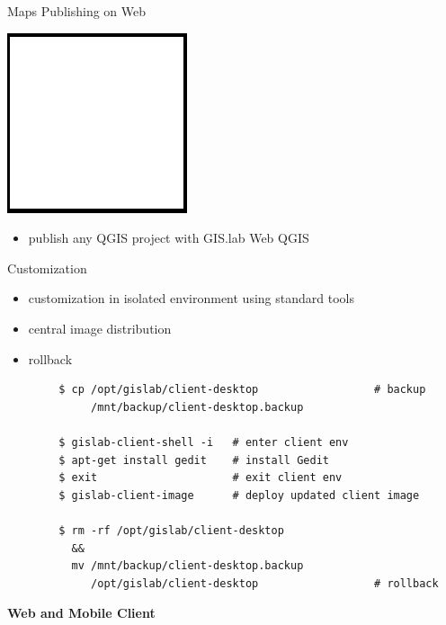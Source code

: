 \documentclass[12pt]{beamer}
\begin{document}
\begin{frame}{Maps Publishing on Web}
	\begin{center}
		\includegraphics[keepaspectratio=true,height=0.5\textheight]{images/image.png}
	\end{center}
	\begin{itemize}
		\item publish any QGIS project with GIS.lab Web QGIS
	\end{itemize}
\end{frame}

\begin{frame}[fragile]{Customization}
	\begin{itemize}
		\item customization in isolated environment using standard tools
		\item central image distribution
		\item rollback
	\end{itemize}
	
	\lstset{language=sh}
	\begin{lstlisting}
		$ cp /opt/gislab/client-desktop                  # backup
		     /mnt/backup/client-desktop.backup
		
		$ gislab-client-shell -i   # enter client env
		$ apt-get install gedit    # install Gedit
		$ exit                     # exit client env
		$ gislab-client-image      # deploy updated client image
		
		$ rm -rf /opt/gislab/client-desktop
		  &&
		  mv /mnt/backup/client-desktop.backup
		     /opt/gislab/client-desktop                  # rollback
	\end{lstlisting}
\end{frame}


\begin{frame}
	\begin{center}
		\LARGE\textbf{Web and Mobile Client}	
	\end{center}
\end{frame}
\end{document}
